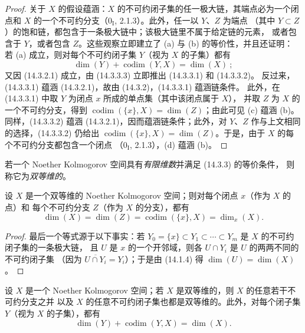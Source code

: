 \begin{proof}
关于 $X$ 的假设蕴涵：$X$ 的不可约闭子集的任一极大链，其端点必为一个闭点和 $X$
的一个不可约分支（$0_{\mathrm I}$, 2.1.3）。此外，任一以 $Y$、$Z$ 为端点
（其中 $Y\subset Z$）的饱和链，都包含于一条极大链中；该极大链里不属于给定链的元素，
或者包含于 $Y$，或者包含 $Z$。这些观察立即建立了 (a) 与 (b) 的等价性，并且还证明：
若 (a) 成立，则对每个不可约闭子集 $Y$（视为 $X$ 的子集）都有
\[
  \dim(Y)+\operatorname{codim}(Y,X)=\dim(X)~;
  \tag{14.3.3.3}\label{0.14.3.3.3-fr}
\]
又因 (14.3.2.1) 成立，由 (14.3.3.3) 立即推出 (14.3.3.1) 和 (14.3.3.2)。
反过来，(14.3.3.1) 蕴涵 (14.3.2.1)，故由 (14.3.2)，(14.3.3.1) 蕴涵链条件。
此外，在 (14.3.3.1) 中取 $Y$ 为闭点 $x$ 所成的单点集（其中该闭点属于 $X$），
并取 $Z$ 为 $X$ 的一个不可约分支，得到
$\operatorname{codim}(\{x\},X)=\dim(Z)$；由此可见 (c) 蕴涵 (b)。
同样，(14.3.3.2) 蕴涵 (14.3.2.1)，因而蕴涵链条件；此外，对 $Y$、$Z$
作与上文相同的选择，(14.3.3.2) 仍给出
$\operatorname{codim}(\{x\},X)=\dim(Z)$。于是，由于 $X$ 的每个不可约分支都包含一个闭点
（$0_{\mathrm I}$, 2.1.3），(d) 蕴涵 (b)。
\end{proof}

若一个 Noether Kolmogorov 空间具有\emph{有限维数}并满足 (14.3.3) 的等价条件，
则称它为\emph{双等维的}。

\begin{corollary}[14.3.4]
\label{0.14.3.4-fr}
设 $X$ 是一个双等维的 Noether Kolmogorov 空间；则对每个闭点 $x$（作为 $X$ 的点）和
每个不可约分支 $Z$（作为 $X$ 的分支），都有
\[
  \dim(X)=\dim(Z)=\operatorname{codim}(\{x\},X)=\dim_x(X).
  \tag{14.3.4.1}\label{0.14.3.4.1-fr}
\]
\end{corollary}

\begin{proof}
最后一个等式源于以下事实：若
$Y_0=\{x\}\subset Y_1\subset\cdots\subset Y_m$ 是 $X$ 的不可约闭子集的一条极大链，
且 $U$ 是 $x$ 的一个开邻域，则各 $U\cap Y_i$ 是 $U$ 的两两不同的不可约闭子集
（因为 $\overline{U\cap Y_i}=Y_i$）；于是由 (14.1.4) 得
$\dim(U)=\dim(X)$。
\end{proof}

\begin{corollary}[14.3.5]
\label{0.14.3.5-fr}
设 $X$ 是一个 Noether Kolmogorov 空间；若 $X$ 是双等维的，则 $X$ 的任意若干不可约分支之并
以及 $X$ 的任意不可约闭子集也都是双等维的。此外，对每个闭子集 $Y$（视为 $X$ 的子集），都有
\[
  \dim(Y)+\operatorname{codim}(Y,X)=\dim(X).
  \tag{14.3.5.1}\label{0.14.3.5.1-fr}
\]
\end{corollary}

